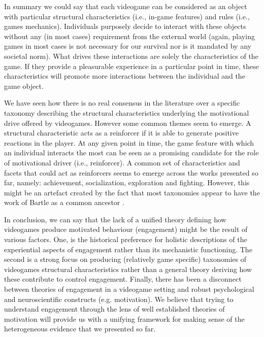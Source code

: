 In summary we could say that each videogame can be considered as an object with particular structural characteristics (i.e., in-game features) and rules (i.e., games mechanics). Individuals purposely decide to interact with these objects without any (in most cases) requirement from the external world (again, playing games in most cases is not necessary for our survival nor is it mandated by any societal norm). What drives these interactions are solely the characteristics of the game. If they provide a pleasurable experience in a particular point in time, these characteristics will promote more interactions between the individual and the game object. 

We have seen how there is no real consensus in the literature over a specific taxonomy describing the structural characteristics underlying the motivational drive offered by videogames. However some common themes seem to emerge. A structural characteristic acts as a reinforcer if it is able to generate positive reactions in the player. At any given point in time, the game feature with which an individual interacts the most can be seen as a promising candidate for the role of motivational driver (i.e., reinforcer). A common set of characteristics and facets that could act as reinforcers seems to emerge across the works presented so far, namely: achievement, socialization, exploration and fighting. However, this might be an artefact created by the fact that most taxonomies appear to have the work of Bartle as a common ancestor \cite{bartle1996hearts,yee2006motivations,nacke2011brainhex}. 

In conclusion, we can say that the lack of a unified theory defining how videogames produce motivated behaviour (engagement) might be the result of various factors. One, is the historical preference for holistic descriptions of the experiential aspects of engagement rather than its mechanistic functioning. The second is a strong focus on producing (relatively game specific) taxonomies of videogames structural characteristics rather than a general theory deriving how these contribute to control engagement. Finally, there has been a disconnect between theories of engagement in a videogame setting and robust psychological and neuroscientific constructs (e.g. motivation). We believe that trying to understand engagement through the lens of well established theories of motivation will provide us with a unifying framework for making sense of the heterogeneous evidence that we presented so far.

